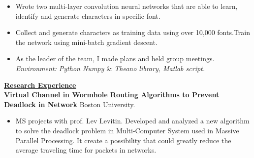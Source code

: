 \documentclass{resume} %
\begin{document}
\begin{spacing}{1}
\begin{center}
\begin{itemize}
\item{Wrote two multi-layer convolution neural networks that are able to learn, identify and generate characters in specific font. } \\
\item{Collect and generate characters as training data using over 10,000 fonts.Train the network using mini-batch gradient descent. } \\
\item{As the leader of the team, I made plans and held group meetings. } \\
\hspace{-9mm}\textit{Environment: Python Numpy $\&$ Theano library, Matlab script.}
\vspace{-1mm}
\end{itemize}

\vspace{2mm}
\uline{{\bf{\LARGE Research Experience}}\hfill{\hspace{10cm}{}}} \\
\vspace{1mm}
{\bf Virtual Channel in Wormhole Routing Algorithms to Prevent Deadlock in Network} \hfill {\small Boston University.} \\
\vspace{-0mm}
\begin{itemize}
\item{MS projects with prof. Lev Levitin. Developed and analyzed a new algorithm  to solve the deadlock problem in Multi-Computer System used in Massive Parallel Processing. It create a possibility that could greatly reduce the average traveling time for packets in networks.} \\
\end{itemize}
\vspace{-2mm}


\end{center}
\end{spacing}
\end{document}
